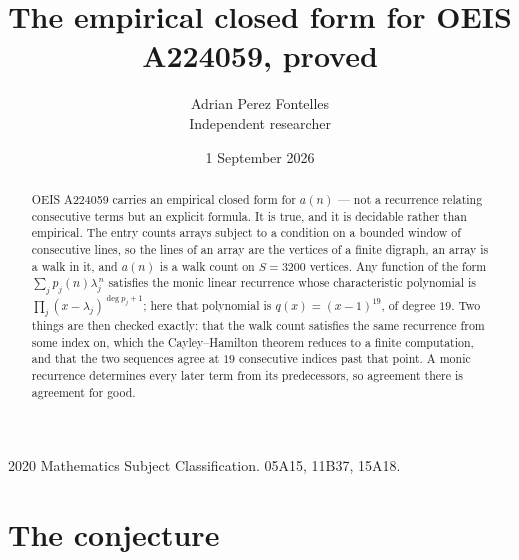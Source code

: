 \documentclass[11pt,a4paper]{article}
\title{The empirical closed form for OEIS A224059, proved}
\author{Adrian Perez Fontelles\\ \small Independent researcher}
\date{1 September 2026}
\theoremstyle{plain}
\theoremstyle{definition}
\begin{document}
\maketitle

\begin{abstract}
OEIS A224059 carries an empirical closed form for $a(n)$ --- not a recurrence relating
consecutive terms but an explicit formula. It is true, and it is decidable rather than
empirical. The entry counts arrays subject to a condition on a bounded window of consecutive lines, so the lines of an array are the
vertices of a finite digraph, an array is a walk in it, and $a(n)$ is a walk count on
$S=3200$ vertices. Any function of the form $\sum_j p_j(n)\lambda_j^{\,n}$ satisfies the
monic linear recurrence whose characteristic polynomial is
$\prod_j(x-\lambda_j)^{\deg p_j+1}$; here that polynomial is $q(x)=(x-1)^{19}$, of degree
$19$. Two things are then checked exactly: that the walk count satisfies the same
recurrence from some index on, which the Cayley--Hamilton theorem reduces to a finite
computation, and that the two sequences agree at $19$ consecutive indices past that
point. A monic recurrence determines every later term from its predecessors, so agreement
there is agreement for good.
\end{abstract}

\noindent\small 2020 Mathematics Subject Classification. 05A15, 11B37, 15A18.\normalsize

\section{The conjecture}
\end{document}
